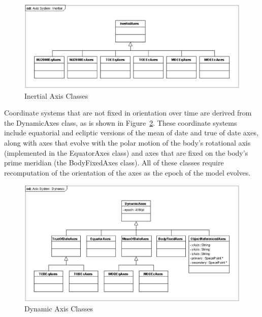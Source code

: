 \begin{figure}
\begin{center}
\includegraphics[scale=0.5]{Images/AxisSystemInertial.eps}
\caption{\label{figure:InertialAxisHierarchy}Inertial Axis Classes}
\end{center}
\end{figure}

Coordinate systems that are not fixed in orientation over time are derived from the DynamicAxes
class, as is shown in Figure~\ref{figure:DynamicAxisHierarchy}.  These coordinate systems include
equatorial and ecliptic versions of the mean of date and true of date axes, along with axes that
evolve with the polar motion of the body's rotational axis (implemented in the EquatorAxes class)
and axes that are fixed on the body's prime meridian (the BodyFixedAxes class). All of these classes
require recomputation of the orientation of the axes as the epoch of the model evolves.

\begin{figure}
\begin{center}
\includegraphics[scale=0.5]{Images/AxisSystemDynamic.eps}
\caption{\label{figure:DynamicAxisHierarchy}Dynamic Axis Classes}
\end{center}
\end{figure}

